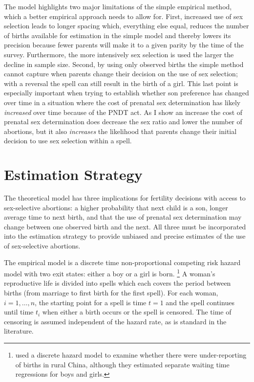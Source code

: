 \documentclass[12pt,letterpaper]{article}
\begin{document}
The model highlights two major limitations of the simple 
empirical method, which a better empirical approach needs to 
allow for.
First, increased use of sex selection leads to longer spacing which,
everything else equal, reduces the number of births available for 
estimation in the simple model and thereby lowers its precision
because fewer parents will make it to a given parity by the time of the survey.
Furthermore, the more intensively sex selection is used the larger 
the decline in sample size.
Second, by using only observed births the simple method cannot capture
when parents change their decision on the use of sex selection;
with a reversal the spell can still result in the birth of a girl.
This last point is especially important when trying to establish whether 
son preference has changed over time in a situation where the cost of prenatal 
sex determination has likely \emph{increased} over time because of the PNDT act.
As I show an increase the cost of prenatal sex determination does 
decrease the sex ratio and lower the number of abortions, but 
it also \emph{increases} the likelihood that parents change their initial
decision to use sex selection within a spell.




\section{Estimation Strategy\label{sec:strategy}}

The theoretical model has three implications for fertility decisions with access to 
sex-selective abortions: 
a higher probability that next child is a son, 
longer average time to next birth, 
and that the use of prenatal sex determination may change between one observed 
birth and the next.
All three must be incorporated into the estimation strategy
to provide unbiased and precise estimates of the use of sex-selective abortions.%

The empirical model is a discrete time non-proportional competing risk hazard model with 
two exit states: either a boy or a girl is born.%
\footnote{
\cite{Merli2000} used a discrete hazard model to examine whether 
there were under-reporting of births in rural China, although they 
estimated separate waiting time regressions for boys and girls.
}
A woman's reproductive life is divided into spells which each covers the period between
births (from marriage to first birth for the first spell).
For each woman, $i=1,\ldots,n$, the starting point for a spell is time $t=1$ and 
the spell continues until time $t_i$ when either a birth occurs or the spell is censored.
The time of censoring is assumed independent of the hazard rate,
as is standard in the literature.
\end{document}
